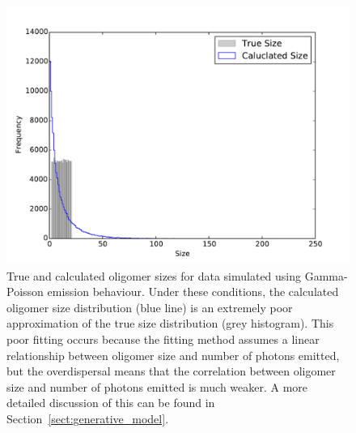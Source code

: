 \begin{figure}
   \begin{center}
      \includegraphics*[clip=true, width=6in]{sizing/True_vs_Measured_oligomer_events_uniform_100000_hist.pdf}
      \caption{True and calculated oligomer sizes for data simulated using Gamma-Poisson emission behaviour. Under these conditions, the calculated oligomer size distribution (blue line) is an extremely poor approximation of the true size distribution (grey histogram). This poor fitting occurs because the fitting method assumes a linear relationship between oligomer size and number of photons emitted, but the overdispersal means that the correlation between oligomer size and number of photons emitted is much weaker. A more detailed discussion of this can be found in Section~\ref{sect:generative_model}.}
      \label{fig:gamma_Poisson_size_photons_uniform}
   \end{center}
\end{figure}

